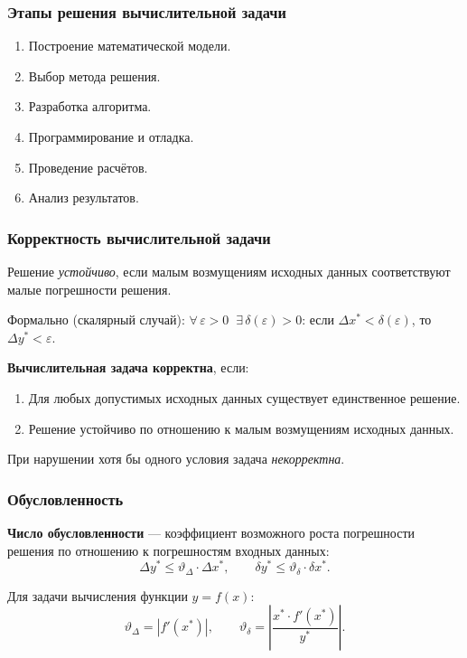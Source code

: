 \subsubsection*{Этапы решения вычислительной задачи}

\begin{enumerate}
    \item Построение математической модели.
    \item Выбор метода решения.
    \item Разработка алгоритма.
    \item Программирование и отладка.
    \item Проведение расчётов.
    \item Анализ результатов.
\end{enumerate}

\subsubsection*{Корректность вычислительной задачи}

Решение \textit{устойчиво}, если малым возмущениям исходных данных соответствуют малые погрешности решения.

Формально (скалярный случай): $\forall\,\varepsilon > 0\;\;\exists\,\delta(\varepsilon) > 0$: если $\Delta x^* < \delta(\varepsilon)$, то $\Delta y^* < \varepsilon$.

\textbf{Вычислительная задача корректна}, если:
\begin{enumerate}
    \item Для любых допустимых исходных данных существует единственное решение.
    \item Решение устойчиво по отношению к малым возмущениям исходных данных.
\end{enumerate}

При нарушении хотя бы одного условия задача \textit{некорректна}.

\subsubsection*{Обусловленность}

\textbf{Число обусловленности} --- коэффициент возможного роста погрешности решения по отношению к погрешностям входных данных:
\[
    \Delta y^* \leq \vartheta_\Delta \cdot \Delta x^*, \qquad
    \delta y^* \leq \vartheta_\delta \cdot \delta x^*.
\]

Для задачи вычисления функции $y = f(x)$:
\[
    \vartheta_\Delta = |f'(x^*)|, \qquad
    \vartheta_\delta = \left|\frac{x^* \cdot f'(x^*)}{y^*}\right|.
\]

